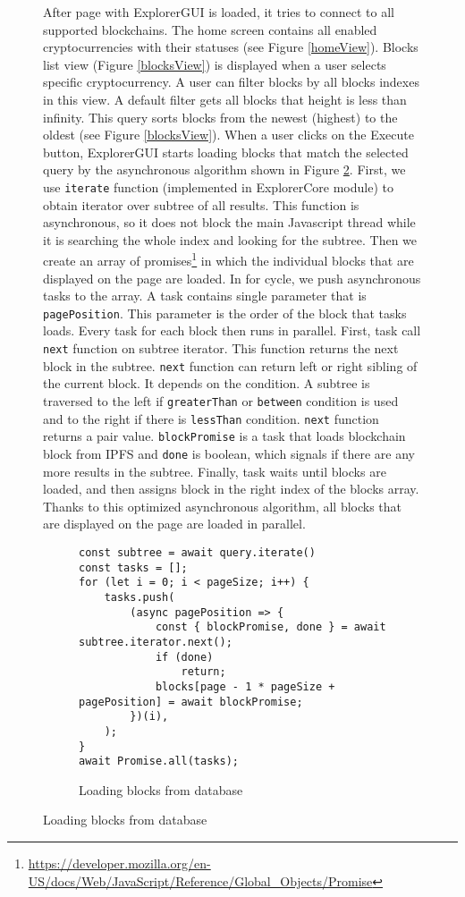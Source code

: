 \begin{figure}[h]


After page with ExplorerGUI is loaded, it tries to connect to all supported blockchains. The home screen contains all enabled cryptocurrencies with their statuses (see Figure \ref{homeView}). Blocks list view (Figure \ref{blocksView}) is displayed when a user selects specific cryptocurrency. A user can filter blocks by all blocks indexes in this view. A default filter gets all blocks that height is less than infinity. This query sorts blocks from the newest (highest) to the oldest (see Figure \ref{blocksView}). When a user clicks on the Execute button, ExplorerGUI starts loading blocks that match the selected query by the asynchronous algorithm shown in Figure \ref{blocksLoading}. First, we use \texttt{iterate} function (implemented in ExplorerCore module) to obtain iterator over subtree of all results. This function is asynchronous, so it does not block the main Javascript thread while it is searching the whole index and looking for the subtree. Then we create an array of promises\footnote{\url{https://developer.mozilla.org/en-US/docs/Web/JavaScript/Reference/Global_Objects/Promise}} in which the individual blocks that are displayed on the page are loaded. In for cycle, we push asynchronous tasks to the array. A task contains single parameter that is \texttt{pagePosition}. This parameter is the order of the block that tasks loads. Every task for each block then runs in parallel. First, task call \texttt{next} function on subtree iterator. This function returns the next block in the subtree. \texttt{next} function can return left or right sibling of the current block. It depends on the condition. A subtree is traversed to the left if \texttt{greaterThan} or \texttt{between} condition is used and to the right if there is \texttt{lessThan} condition. \texttt{next} function returns a pair value. \texttt{blockPromise} is a task that loads blockchain block from IPFS and \texttt{done} is boolean, which signals if there are any more results in the subtree. Finally, task waits until blocks are loaded, and then assigns block in the right index of the blocks array. Thanks to this optimized asynchronous algorithm, all blocks that are displayed on the page are loaded in parallel.

\begin{figure}[h]
    \centering
    \begin{lstlisting}[style=ES6]
const subtree = await query.iterate()
const tasks = [];
for (let i = 0; i < pageSize; i++) {
    tasks.push(
        (async pagePosition => {
            const { blockPromise, done } = await subtree.iterator.next();
            if (done)
                return;
            blocks[page - 1 * pageSize + pagePosition] = await blockPromise;
        })(i),
    );
}
await Promise.all(tasks);
    \end{lstlisting}
    \caption{Loading blocks from database}
    \label{blocksLoading}
\end{figure}




\end{figure}
